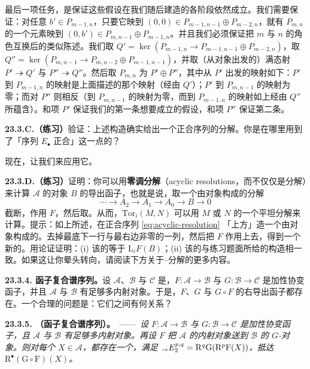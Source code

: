 最后一项任务，是保证这些假设在我们随后建造\trDoubleComplex{}的各阶段依然成立。我们需要保证：对任意 $b'\in P_{m-1,n}$，只要它映到 $(0,0)\in P_{m-1,n-1}\oplus P_{m-2,n}$，就有 $P_{m,n}$ 的一个元素映到 $(0,b')\in P_{m,n-1}\oplus P_{m-1,n}$。并且我们必须保证把 $m$ 与 $n$ 的角色互换后的类似陈述。我们取 $Q'=\ker(P_{m-1,n}\to P_{m-1,n-1}\oplus P_{m-2,n})$，取 $Q''=\ker(P_{m,n-1}\to P_{m,n-2}\oplus P_{m-1,n-1})$，并取（从\trProjectiveObj{}对象出发的）满态射 $P'\twoheadrightarrow Q'$ 与 $P''\twoheadrightarrow Q''$。然后取 $P_{m,n}$ 为 $P'\oplus P''$，其中从 $P'$ 出发的映射如下：$P'$ 到 $P_{m-1,n}$ 的映射是上面描述的那个映射（经由 $Q'$）；$P'$ 到 $P_{m,n-1}$ 的映射为零；而对 $P''$ 则相反（到 $P_{m,n-1}$ 的映射为零，而到 $P_{m-1,n}$ 的映射如上经由 $Q''$ 所蕴含）。和项 $P'$ 保证我们的第一条想要成立的假设，和项 $P''$ 保证第二条。

\textbf{23.3.C.（练习）}\quad 验证：上述构造确实给出一个正合序列的\trProjectiveObj{}分解。你是在哪里用到了「序列 $E_\bullet$ 正合」这一点的？

现在，让我们来应用它。

\textbf{23.3.D.（练习）}\quad 证明：你可以用\textbf{零调分解}（acyclic resolutions，而不仅仅是\trProjectiveObj{}分解）来计算 $\mathscr{A}$ 的对象 $B$ 的导出函子，也就是说，取一个由\trAcyclic{}对象构成的分解
\[
\tag{23.3.3.2}\label{eq:acyclic-resolution}
\cdots \longrightarrow A_2 \longrightarrow A_1 \longrightarrow A_0 \longrightarrow B \longrightarrow 0
\]
截断，作用 $F$，然后取\trHomology。从而，$\mathrm{Tor}_i(M,N)$ 可以用 $M$ 或 $N$ 的一个平坦分解来计算。提示：如上所述，在正合序列 \eqref{eq:acyclic-resolution} 「上方」造一个由\trProjectiveObj{}对象构成的\trDoubleComplex。去掉最底下一行与最右边非零的一列，然后把 $F$ 作用上去，得到一个新的\trDoubleComplex。用\trSpectralSequence{}论证证明：(i) 该\trDoubleComplex{}的\trHomology{}等于 $\mathrm{L}_iF(B)$；(ii) 该\trDoubleComplex{}的\trHomology{}与练习题面所给的构造相一致。如果这让你晕头转向，请阅读下方关于\trCartan--\trEilenberg{}分解的更多内容。

\textbf{23.3.4. \trGrothendieck 函子复合谱序列。}\quad 设 $\mathscr{A}$、$\mathscr{B}$ 与 $\mathscr{C}$ 是\trAbelianCategory，$F\colon\mathscr{A}\to\mathscr{B}$ 与 $G\colon\mathscr{B}\to\mathscr{C}$ 是\trLeftExact{}加性协变函子，并且 $\mathscr{A}$ 与 $\mathscr{B}$ 有足够多内射对象。于是，$F$、$G$ 与 $G\circ F$ 的右导出函子都存在。一个合理的问题是：它们之间有何关系？

\textbf{23.3.5. \trhTheorem（\trGrothendieck 函子复合谱序列）。}\ ——\ \emph{设 $F\colon\mathscr{A}\to\mathscr{B}$ 与 $G\colon\mathscr{B}\to\mathscr{C}$ 是\trLeftExact{}加性协变函子，且 $\mathscr{A}$ 与 $\mathscr{B}$ 有足够多内射对象。再设 $F$ 把 $\mathscr{A}$ 的内射对象送到 $\mathscr{B}$ 的 $G$-\trAcyclic{}对象。则对每个 $X\in\mathscr{A}$，都存在一个\trSpectralSequence，满足 ${}_{\to}E^{p,q}_{2}=\mathrm{R}^q\mathrm{G}(\mathrm{R}^p\mathrm{F}(X))$，抵达 $\mathrm{R}^\bullet(\mathrm{G}\circ\mathrm{F})(X)$。}


